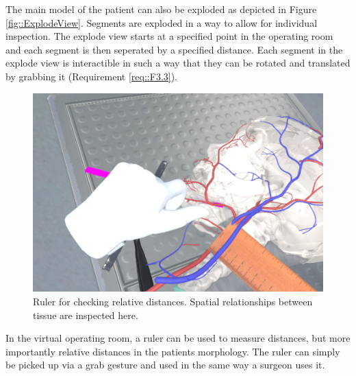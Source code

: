 The main model of the patient can also be exploded as depicted in Figure \ref{fig::ExplodeView}.
Segments are exploded in a way to allow for individual inspection.
The explode view starts at a specified point in the operating room and each segment is then seperated by a specified distance.
Each segment in the explode view is interactible in such a way that they can be rotated and translated by grabbing it (Requirement \ref{req::F3.3}).

\begin{figure}[ht]
    \centering
    \includegraphics[width=\linewidth]{images/implementation/features/visualization/ruler.png}
    \caption{\label{fig::FeatureRuler} Ruler for checking relative distances. Spatial relationships between tissue are inspected here.}
\end{figure}

In the virtual operating room, a ruler can be used to measure distances, but more importantly relative distances in the patients morphology.
The ruler can simply be picked up via a grab gesture and used in the same way a surgeon uses it.